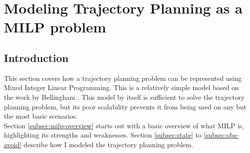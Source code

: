 \chapter{Modeling Trajectory Planning as a MILP problem}
\label{section:modelingbasic}
\section{Introduction}
This section covers how a trajectory planning problem can be represented using Mixed Integer Linear Programming. This is a relatively simple model based on the work by Bellingham \cite{Bellingham2002}. This model by itself is sufficient to solve the trajectory planning problem, but its poor scalability prevents it from being used on any but the most basic scenarios. \\

Section \ref{subsec:milp-overview} starts out with a basic overview of what MILP is, highlighting its strengths and weaknesses. Section \ref{subsec:state} to \ref{subsec:obs-avoid} describe how I modeled the trajectory planning problem. 






